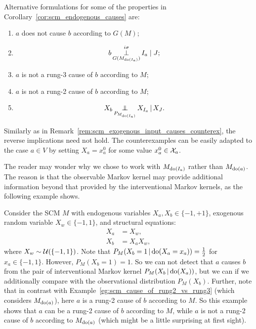 \begin{Rem}\label{rem:scm_endogenous_causes_alt}
  Alternative formulations for some of the properties in Corollary~\ref{cor:scm_endogenous_causes} are:
  \begin{enumerate}
    \item[(i')] $a$ does not cause $b$ according to $G(M)$;
    \item[(i'')] $$b \operatorname*{\perp}^{i\sigma}_{G(M_{\operatorname{do}(I_a)})} I_a \mid J;$$
    \item[(iv')] $a$ is not a rung-3 cause of $b$ according to $M$;
    \item[(v')] $a$ is not a rung-2 cause of $b$ according to $M$;
    \item[(v'')] $$X_b \operatorname*{\perp\mkern-11mu\perp}_{P_{M_{\operatorname{do}(I_a)}}} X_{I_a} \operatorname*{|} X_J.$$
  \end{enumerate}
\end{Rem}
\begin{Rem}\label{rem:scm_exogenous_input_causes_counterex}
  Similarly as in Remark~\ref{rem:scm_exogenous_input_causes_counterex}, the reverse implications need not hold.
  The counterexamples can be easily adapted to the case $a \in V$ by setting $X_a = x_a^0$ for some value $x_a^0 \in \mathcal{X}_a$.
\end{Rem}

The reader may wonder why we chose to work with $M_{\operatorname{do}(I_a)}$ rather than $M_{\operatorname{do}(a)}$. 
The reason is that the observable Markov kernel may provide additional information beyond that provided by the interventional Markov kernels, as the following example shows.
\begin{Eg}\label{eg:scm_cause_of_include_observational_old}
  Consider the SCM $M$ with endogenous variables $X_a, X_b \in \{-1,+1\}$, exogenous random variable $X_w \in \{-1,1\}$, and structural equations:
  \begin{align*}
    X_a &= X_w, \\
    X_b &= X_a X_w,
  \end{align*}
  where $X_w \sim \mathcal{U}(\{-1,1\})$.
  Note that $P_M(X_b = 1 \operatorname*{|} \operatorname{do}(X_a = x_a)) = \tfrac{1}{2}$ for $x_a \in \{-1,1\}$.
  However, $P_M(X_b = 1) = 1$.
  So we can not detect that $a$ causes $b$ from the pair of interventional Markov kernel $P_M(X_b \operatorname*{|} \operatorname{do}(X_a))$,
  but we can if we additionally compare with the observational distribution $P_M(X_b)$.
  Further, note that in contrast with Example~\ref{eg:scm_cause_of_rung2_vs_rung3} (which considers $M_{\operatorname{do}(a)}$), here $a$ is a rung-2 cause of $b$ according to $M$.
  So this example shows that $a$ can be a rung-2 cause of $b$ according to $M$, while $a$ is not a rung-2 cause of $b$ according to $M_{\operatorname{do}(a)}$ (which might be a little surprising at first sight).
\end{Eg}

